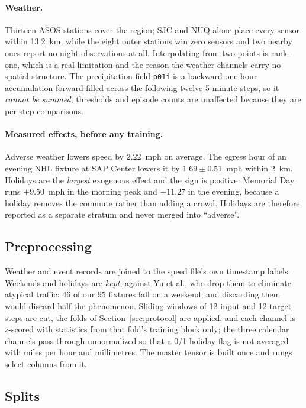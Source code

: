 \documentclass[letterpaper]{article}
\begin{document}
\paragraph{Weather.} Thirteen ASOS stations cover the region; SJC and NUQ alone place every sensor within 13.2~km, while the eight outer stations win zero sensors and two nearby ones report no night observations at all. Interpolating from two points is rank-one, which is a real limitation and the reason the weather channels carry no spatial structure. The precipitation field \texttt{p01i} is a backward one-hour accumulation forward-filled across the following twelve 5-minute steps, so it \emph{cannot be summed}; thresholds and episode counts are unaffected because they are per-step comparisons.

\paragraph{Measured effects, before any training.} Adverse weather lowers speed by $2.22$~mph on average. The egress hour of an evening NHL fixture at SAP Center lowers it by $1.69\pm0.51$~mph within 2~km. Holidays are the \emph{largest} exogenous effect and the sign is positive: Memorial Day runs $+9.50$~mph in the morning peak and $+11.27$ in the evening, because a holiday removes the commute rather than adding a crowd. Holidays are therefore reported as a separate stratum and never merged into ``adverse''.

\subsection{Preprocessing}

Weather and event records are joined to the speed file's own timestamp labels. Weekends and holidays are \emph{kept}, against Yu et al., who drop them to eliminate atypical traffic: 46 of our 95 fixtures fall on a weekend, and discarding them would discard half the phenomenon. Sliding windows of 12 input and 12 target steps are cut, the folds of Section~\ref{sec:protocol} are applied, and each channel is z-scored with statistics from that fold's training block only; the three calendar channels pass through unnormalized so that a 0/1 holiday flag is not averaged with miles per hour and millimetres. The master tensor is built once and rungs select columns from it.

\subsection{Splits}
\end{document}
